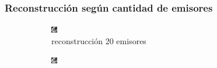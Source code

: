 \documentclass[11pt]{beamer}
\begin{document}
\begin{frame}
    \frametitle{Reconstrucción según cantidad de emisores}
    
    \begin{figure}[H]
        \centering
    
        \begin{subfigure}[h]{0.3\textwidth} 
            \includegraphics[width=\textwidth]{img/tomo_emisores_20.png}
            \caption{reconstrucción 20 emisores}
            \label{fig:reconstruccion 20 emisores}
        \end{subfigure}%
        \hfill
        \begin{subfigure}[h]{0.3\textwidth}
            \includegraphics[width=\textwidth]{img/tomo_emisores_60.png}

\end{subfigure}
\end{figure}
\end{frame}
\end{document}
